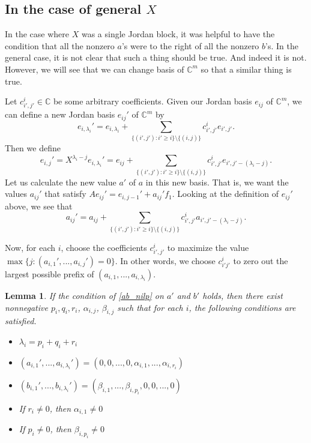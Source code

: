 \documentclass[12pt,psamsfonts]{article}
\newtheorem{lemma}[theorem]{Lemma}
\begin{document}
\subsection{In the case of general \(X\)}
In the case where \(X\) was a single Jordan block, it was helpful to have the condition that all the nonzero \(a\)'s were to the right of all the nonzero \(b\)'s.
In the general case, it is not clear that such a thing should be true.
And indeed it is not.
However, we will see that we can change basis of \(\mathbb{C}^m\) so that a similar thing is true.
\par Let \(c_{i',j'}^i \in \mathbb{C}\) be some arbitrary coefficients.
Given our Jordan basis \(e_{ij}\) of \(\mathbb{C}^m\), we can define a new Jordan basis \(e_{ij}'\) of \(\mathbb{C}^m\) by 
\[e_{i, \lambda_i}' = e_{i, \lambda_i} + \sum_{\{(i',j') : i' \geq i\} \setminus \{(i, j)\}} c^i_{i',j'} e_{i',j'}.\]
Then we define
\[e_{i,j}' = X^{\lambda_i - j} e_{i, \lambda_i}' = e_{ij} + \sum_{\{(i', j') : i' \geq i\} \setminus \{(i, j)\}} c^i_{i',j'} e_{i', j' - (\lambda_i - j)}.\]
Let us calculate the new value \(a'\) of \(a\) in this new basis.
That is, we want the values \(a_{ij}'\) that satisfy \(Ae_{ij}' = e_{i, j - 1}' + a_{ij}' f_1\).
Looking at the definition of \(e_{ij}'\) above, we see that
\[a_{ij}' = a_{ij} + \sum_{\{(i',j') : i' \geq i\} \setminus \{(i, j)\}} c_{i',j'}^i a_{i', j' - (\lambda_i - j)}.\]
\par Now, for each \(i\), choose the coefficients \(c_{i',j'}^i\) to maximize the value \(\max\{j : (a_{i,1}', ..., a_{i, j}') = 0\}\).
In other words, we choose \(c_{i'j'}^i\) to zero out the largest possible prefix of \((a_{i, 1}, ..., a_{i, \lambda_i})\).
\begin{lemma}
    If the condition of \cref{ab_nilp} on \(a'\) and \(b'\) holds, then there exist nonnegative \(p_i, q_i, r_i\), \(\alpha_{i, j}\), \(\beta_{i, j}\) such that for each \(i\), the following conditions are satisfied.
    \begin{itemize}
        \item \(\lambda_i = p_i + q_i + r_i\)
        \item \((a_{i,1}', ..., a_{i,\lambda_i}') = (0, 0, ..., 0, \alpha_{i,1}, ..., \alpha_{i, r_i})\)
        \item \((b_{i, 1}', ..., b_{i, \lambda_i}') = (\beta_{i, 1}, ..., \beta_{i, p_i}, 0, 0, ..., 0)\)
        \item If \(r_i \neq 0\), then \(\alpha_{i,1} \neq 0\)
        \item If \(p_i \neq 0\), then \(\beta_{i, p_i} \neq 0\)
    \end{itemize}
\end{lemma}
\end{document}
